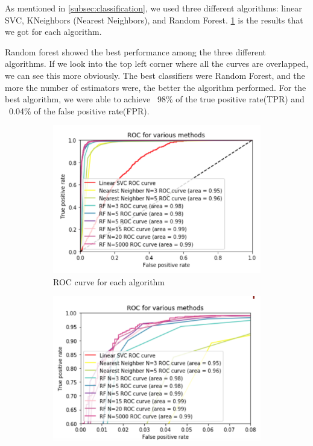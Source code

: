 \documentclass[\docopts]{\docclass}
\begin{document}
As mentioned in \ref{subsec:classification}, we used three different algorithms: linear SVC, KNeighbors (Nearest Neighbors), and Random Forest. \ref{fig:ML_nonmag} is the results that we got for each algorithm.

Random forest showed the best performance among the three different algorithms. If we look into the top left corner where all the curves are overlapped, we can see this more obviously. The best classifiers were Random Forest, and the more the number of estimators were, the better the algorithm performed. For the best algorithm, we were able to achieve ~98$\%$ of the true positive rate(TPR) and ~0.04$\%$ of the false positive rate(FPR).

\begin{figure}
    \centering
    \begin{subfigure}[bt]{0.48\linewidth}        %
        \centering
        \includegraphics[width=\linewidth]{ML_notmagnified.png}
    \caption{ROC curve for each algorithm}
     \label{fig:ML_nonmag}
    \end{subfigure}
    \begin{subfigure}[bt]{0.48\linewidth}        %
        \centering
        \includegraphics[width=\linewidth]{ML_magnified.png}

\end{subfigure}
\end{figure}
\end{document}
